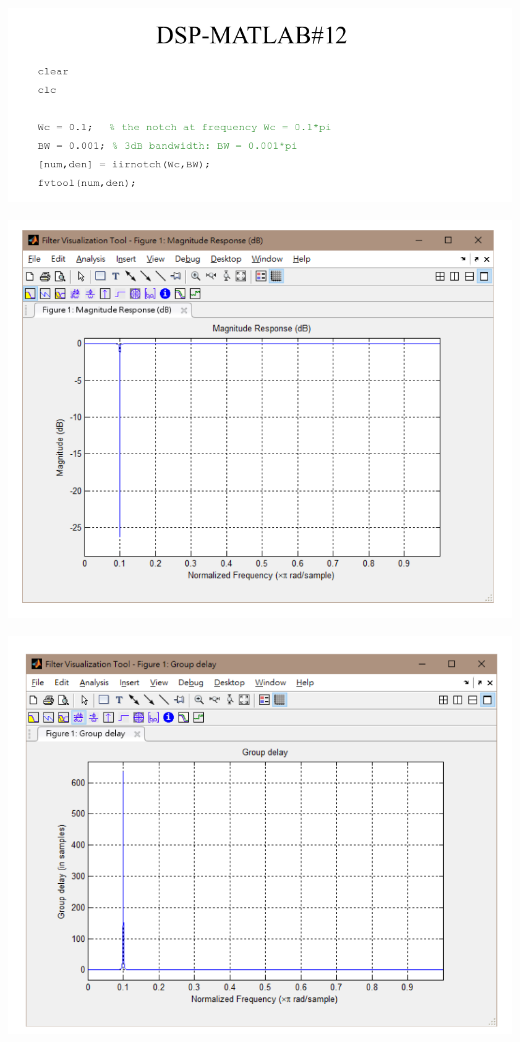 \documentclass[a4paper]{article}
\begin{document}
	\begin{center}
		\includegraphics[width=0.71\linewidth]{screenshot120}
	\end{center}
	\begin{center}
		\includegraphics[width=1\linewidth]{screenshot121}
	\end{center}
	\begin{center}
		\includegraphics[width=1\linewidth]{screenshot122}
	\end{center}
	
	
	
\end{document}
